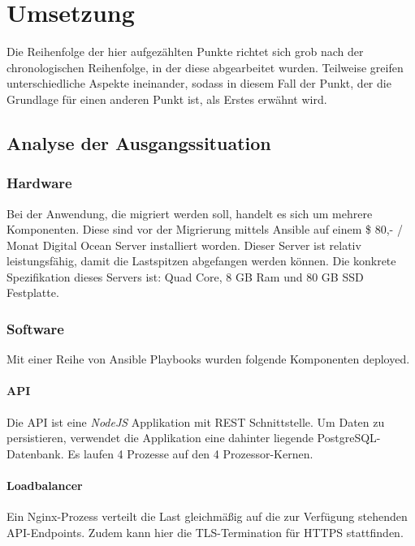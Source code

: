 \chapter{Umsetzung}
\label{cha:Umsetzung}

Die Reihenfolge der hier aufgezählten Punkte richtet sich grob nach der
chronologischen
Reihenfolge, in der diese abgearbeitet wurden.
Teilweise greifen unterschiedliche Aspekte ineinander, sodass in diesem Fall der
Punkt, der die Grundlage für einen anderen Punkt ist, als Erstes erwähnt wird.

\section{Analyse der Ausgangssituation}

\subsection{Hardware}

Bei der Anwendung, die migriert werden soll, handelt es sich um mehrere
Komponenten.
Diese sind vor der Migrierung mittels Ansible auf einem \$ 80,- / Monat
Digital Ocean Server \cite{digitalocean} installiert worden.
Dieser Server ist relativ leistungsfähig, damit die Lastspitzen abgefangen
werden können.
Die konkrete Spezifikation dieses Servers ist: Quad Core, 8 GB Ram und 80 GB SSD
Festplatte.

\subsection{Software}
Mit einer Reihe von Ansible Playbooks wurden folgende Komponenten deployed.

\subsubsection{API}
Die API ist eine \emph{NodeJS} Applikation \cite{nodejs} mit REST Schnittstelle.
Um Daten zu persistieren, verwendet
die Applikation eine dahinter liegende PostgreSQL-Datenbank.
Es laufen 4 Prozesse auf den 4 Prozessor-Kernen.

\subsubsection{Loadbalancer}
Ein Nginx-Prozess verteilt die Last gleichmäßig auf die zur Verfügung
stehenden API-Endpoints.
Zudem kann hier die TLS-Termination für HTTPS stattfinden.

